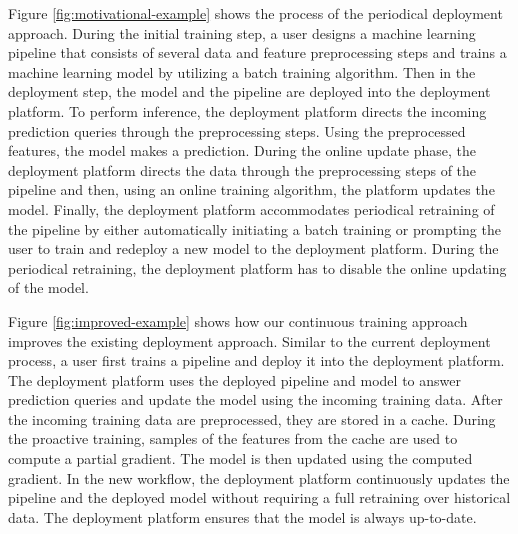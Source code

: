 Figure \ref{fig:motivational-example} shows the process of the periodical deployment approach.
During the initial training step, a user designs a machine learning pipeline that consists of several data and feature preprocessing steps and trains a machine learning model by utilizing a batch training algorithm.
Then in the deployment step, the model and the pipeline are deployed into the deployment platform.
To perform inference, the deployment platform directs the incoming prediction queries through the preprocessing steps.
Using the preprocessed features, the model makes a prediction.
During the online update phase, the deployment platform directs the data through the preprocessing steps of the pipeline and then, using an online training algorithm, the platform updates the model.
Finally, the deployment platform accommodates periodical retraining of the pipeline by either automatically initiating a batch training or prompting the user to train and redeploy a new model to the deployment platform.
During the periodical retraining, the deployment platform has to disable the online updating of the model.

Figure \ref{fig:improved-example} shows how our continuous training approach improves the existing deployment approach.
Similar to the current deployment process, a user first trains a pipeline and deploy it into the deployment platform.
The deployment platform uses the deployed pipeline and model to answer prediction queries and update the model using the incoming training data.
After the incoming training data are preprocessed, they are stored in a cache.
During the proactive training, samples of the features from the cache are used to compute a partial gradient.
The model is then updated using the computed gradient.
In the new workflow, the deployment platform continuously updates the pipeline and the deployed model without requiring a full retraining over historical data.
The deployment platform ensures that the model is always up-to-date.